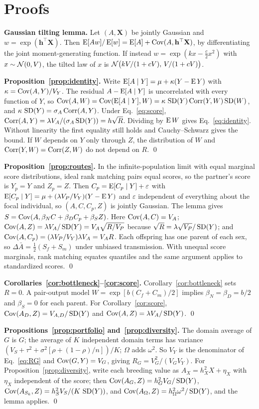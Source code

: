 \section{Proofs}\label{app:proofs}

\noindent\textbf{Gaussian tilting lemma.} Let $(A,\mathbf X)$ be jointly Gaussian and $w=\exp(\mathbf h^\top\mathbf X)$. Then
$\operatorname{E}[Aw]/\operatorname{E}[w]=\operatorname{E}[A]+\operatorname{Cov}(A,\mathbf h^\top\mathbf X)$, by differentiating the joint moment-generating function. If instead
$w=\exp(kx-\tfrac c2x^2)$ with $x\sim\mathcal{N}(0,V)$, the tilted law of $x$ is $\mathcal{N}\big(kV/(1+cV),\,V/(1+cV)\big)$.

\textbf{Proposition~\ref{prop:identity}.} Write $\operatorname{E}[A\mid Y]=\mu+\kappa(Y-\operatorname{E} Y)$ with $\kappa=\operatorname{Cov}(A,Y)/V_Y$. The residual
$A-\operatorname{E}[A\mid Y]$ is uncorrelated with every function of $Y$, so
$\operatorname{Cov}(A,W)=\operatorname{Cov}(\operatorname{E}[A\mid Y],W)=\kappa\,\operatorname{SD}(Y)\operatorname{Corr}(Y,W)\operatorname{SD}(W)$, and $\kappa\,\operatorname{SD}(Y)=\sigma_A\operatorname{Corr}(A,Y)$. Under
Eq.~\eqref{eq:score}, $\operatorname{Corr}(A,Y)=\lambda V_A/(\sigma_A\operatorname{SD}(Y))=h\sqrt R$. Dividing by $\operatorname{E} W$ gives Eq.~\eqref{eq:identity}.
Without linearity the first equality still holds and Cauchy--Schwarz gives the bound. If $W$ depends on $Y$ only through
$Z$, the distribution of $W$ and $\operatorname{Corr}(Y,W)=\operatorname{Corr}(Z,W)$ do not depend on $R$. \qed

\textbf{Proposition~\ref{prop:routes}.} In the infinite-population limit with equal marginal score distributions, ideal rank
matching pairs equal scores, so the partner's score is $Y_p=Y$ and $Z_p=Z$. Then $C_p=\operatorname{E}[C_p\mid Y]+\varepsilon$ with
$\operatorname{E}[C_p\mid Y]=\mu+(\lambda V_P/V_Y)(Y-\operatorname{E} Y)$ and $\varepsilon$ independent of everything about the focal individual, so
$(A,C,C_p,Z)$ is jointly Gaussian. The lemma gives $S=\operatorname{Cov}(A,\beta_NC+\beta_DC_p+\beta_SZ)$. Here $\operatorname{Cov}(A,C)=V_A$;
$\operatorname{Cov}(A,Z)=\lambda V_A/\operatorname{SD}(Y)=V_A\sqrt{R/V_P}$ because $\sqrt R=\lambda\sqrt{V_P}/\operatorname{SD}(Y)$; and
$\operatorname{Cov}(A,C_p)=(\lambda V_P/V_Y)\lambda V_A=V_AR$. Each offspring has one parent of each sex, so
$\Delta\bar A=\tfrac12(S_f+S_m)$ under unbiased transmission. With unequal score marginals, rank matching equates quantiles
and the same argument applies to standardized scores. \qed

\textbf{Corollaries~\ref{cor:bottleneck}--\ref{cor:score}.} Corollary~\ref{cor:bottleneck} sets $R=0$.
A pair-output model $W=\exp[b(C_f+C_m)/2]$ implies $\beta_N=\beta_D=b/2$ and $\beta_S=0$ for each parent. For
Corollary~\ref{cor:score}, $\operatorname{Cov}(A_D,Z)=V_{A,D}/\operatorname{SD}(Y)$ and $\operatorname{Cov}(A,Z)=\lambda V_A/\operatorname{SD}(Y)$. \qed

\textbf{Propositions~\ref{prop:portfolio} and~\ref{prop:diversity}.} The domain average of $G$ is $G$; the average of $K$
independent domain terms has variance $(V_S+\tau^2+\sigma^2[\rho+(1-\rho)/n])/K$; $\Omega$ adds $\omega^2$. So $V_Y$ is the
denominator of Eq.~\eqref{eq:RG} and $\operatorname{Cov}(G,Y)=V_G$, giving $R_G=V_G^2/(V_GV_Y)$. For Proposition~\ref{prop:diversity}, write
each breeding value as $A_X=h_X^2X+\eta_X$ with $\eta_X$ independent of the score; then
$\operatorname{Cov}(A_G,Z)=h_G^2V_G/\operatorname{SD}(Y)$, $\operatorname{Cov}(A_{S_k},Z)=h_S^2V_S/(K\,\operatorname{SD}(Y))$, and $\operatorname{Cov}(A_\Omega,Z)=h_\Omega^2\omega^2/\operatorname{SD}(Y)$, and
the lemma applies. \qed

